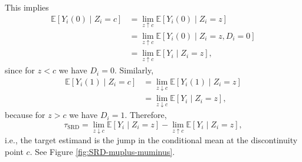 This implies
\begin{align*}
	\mathbb{E}[Y_i(0)\mid Z_i=c]
	&= \lim_{z \uparrow c}\mathbb{E}[Y_i(0)\mid Z_i=z] \\
	&= \lim_{z \uparrow c}\mathbb{E}[Y_i(0)\mid Z_i=z, D_i=0] \\
	&= \lim_{z \uparrow c}\mathbb{E}[Y_i\mid Z_i=z],
\end{align*}
since for $z<c$ we have $D_i=0$. Similarly,
\begin{align*}
	\mathbb{E}[Y_i(1)\mid Z_i=c]
	&= \lim_{z \downarrow c}\mathbb{E}[Y_i(1)\mid Z_i=z] \\
	&= \lim_{z \downarrow c}\mathbb{E}[Y_i\mid Z_i=z],
\end{align*}
because for $z>c$ we have $D_i=1$. Therefore,
\[
\tau_{\text{SRD}}
= \lim_{z \downarrow c}\mathbb{E}[Y_i\mid Z_i=z]
- \lim_{z \uparrow c}\mathbb{E}[Y_i\mid Z_i=z],
\]
i.e., the target estimand is the jump in the conditional mean at the discontinuity point $c$. See Figure \ref{fig:SRD-muplus-muminus}.

